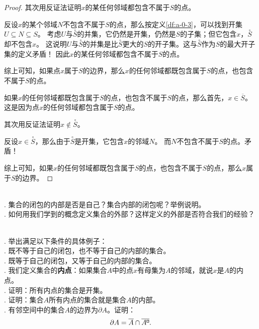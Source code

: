 \documentclass[12pt,UTF8,fontset=none]{ctexbook}
\begin{document}
\begin{appendix}
\begin{proof}
    其次用反证法证明$x$的某任何邻域都包含不属于$S$的点。
    
    反设$x$的某个邻域$N$不包含不属于$S$的点，那么按定义\ref{df:a-0-3}，可以找到开集$U\subseteq N\subseteq S$。
    考虑$U$与$\overset{\circ}{S}$的并集，它仍然是开集，仍然是$S$的子集；但它包含$x$，$\overset{\circ}{S}$却不包含$x$。
    这说明$U$与$\overset{\circ}{S}$的并集是比$\overset{\circ}{S}$更大的$S$的开子集。这与$\overset{\circ}{S}$作为$S$的最大开子集的定义矛盾！
    因此$x$的某任何邻域都包含不属于$S$的点。

    综上可知，如果点$x$属于$S$的边界，那么$x$的任何邻域都既包含属于$S$的点，也包含不属于$S$的点。

    如果$x$的任何邻域都既包含属于$S$的点，也包含不属于$S$的点，那么首先，$x\in \overline{S}$。这是因为点$x$的任何邻域都包含属于$S$的点。
    
    其次用反证法证明$x\notin\overset{\circ}{S}$。
    
    反设$x\in \overset{\circ}{S}$，那么由于$\overset{\circ}{S}$是开集，它包含$x$的邻域$N$。
    而$N$不包含不属于$S$的点。矛盾！

    综上可知，如果$x$的任何邻域都既包含属于$S$的点，也包含不属于$S$的点，那么$x$属于$S$的边界。

\end{proof}

\begin{sk}
    \mbox{} \\
    . 集合的闭包的内部是否是自己？集合内部的闭包呢？举例说明。\\
    . 如何用我们学到的概念定义集合的外部？这样定义的外部是否符合我们的经验？
\end{sk}

\begin{xt}
    \mbox{} \\
    . 举出满足以下条件的具体例子：\\
    . 既不等于自己的闭包，也不等于自己的内部的集合。\\
    . 既等于自己的闭包，又等于自己的内部的集合。\\
    . 我们定义集合的\textbf{内点}：如果集合$A$中的点$x$有母集为$A$的邻域，就说$x$是$A$的内点。\\
    . 证明：所有内点的集合是开集。\\
    . 证明：集合$A$所有内点的集合就是集合$A$的内部。\\
    . 有邻空间中的集合$A$的边界为$\partial A$。证明：
    $$ \partial A = \overline{A} \cap \overline{A^{\bu}}. $$
\end{xt}



\end{appendix}
\end{document}
